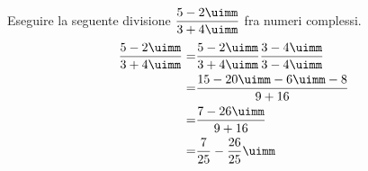 	Eseguire la seguente divisione  $\dfrac{5-2\uimm}{3+4\uimm}$ fra numeri complessi.
	\begin{align*}
	\dfrac{5-2\uimm}{3+4\uimm}=&\dfrac{5-2\uimm}{3+4\uimm}\dfrac{3-4\uimm}{3-4\uimm}\\
	=&\dfrac{15-20\uimm-6\uimm-8}{9+16}\\
	=&\dfrac{7-26\uimm}{9+16}\\
	=&\dfrac{7}{25}-\dfrac{26}{25}\uimm\\
	\end{align*}
